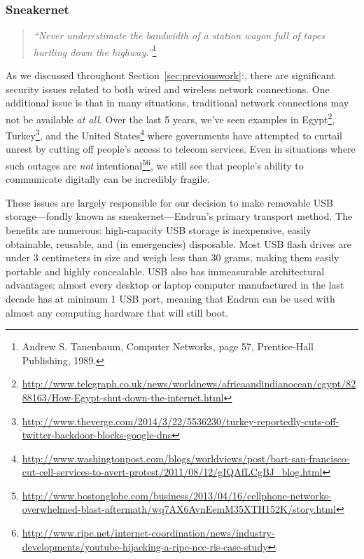 \documentclass[12pt]{article}
\begin{document}
  \subsubsection{Sneakernet}
  
   \begin{quote}
    \emph{``Never underestimate the bandwidth of a station wagon full of tapes hurtling down the highway.''}\footnote{Andrew S. Tanenbaum, Computer Networks, page 57, Prentice-Hall Publishing, 1989.}
  \end{quote}

  As we discussed throughout Section~\ref{sec:previouswork}:, there are significant security issues related to both wired and wireless network connections. One additional issue is that in many situations, traditional network connections may not be available \textit{at all}. Over the last 5 years, we've seen examples in Egypt\footnote{\url{http://www.telegraph.co.uk/news/worldnews/africaandindianocean/egypt/8288163/How-Egypt-shut-down-the-internet.html}}, Turkey\footnote{\url{http://www.theverge.com/2014/3/22/5536230/turkey-reportedly-cuts-off-twitter-backdoor-blocks-google-dns}}, and the United States\footnote{\url{http://www.washingtonpost.com/blogs/worldviews/post/bart-san-francisco-cut-cell-services-to-avert-protest/2011/08/12/gIQAfLCgBJ_blog.html}} where governments have attempted to curtail unrest by cutting off people's access to telecom services. Even in situations where such outages are \textit{not} intentional\footnote{\url{http://www.bostonglobe.com/business/2013/04/16/cellphone-networks-overwhelmed-blast-aftermath/wq7AX6AvnEemM35XTH152K/story.html}}\footnote{\url{http://www.ripe.net/internet-coordination/news/industry-developments/youtube-hijacking-a-ripe-ncc-ris-case-study}}, we still see that people's ability to communicate digitally can be incredibly fragile.
  
  These issues are largely responsible for our decision to make removable USB storage---fondly known as sneakernet---Endrun's primary transport method. The benefits are numerous: high-capacity USB storage is inexpensive, easily obtainable, reusable, and (in emergencies) disposable. Most USB flash drives are under 3 centimeters in size and weigh less than 30 grams, making them easily portable and highly concealable. USB also has immeasurable architectural advantages; almost every desktop or laptop computer manufactured in the last decade has at minimum 1 USB port, meaning that Endrun can be used with almost any computing hardware that will still boot.
  
\end{document}
